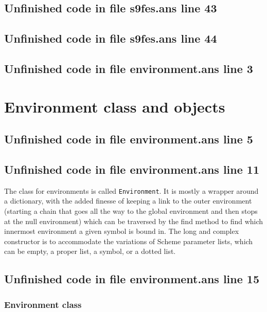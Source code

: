 \documentclass[twoside,9pt]{report}
\begin{document}
\section{Unfinished code in file s9fes.ans line 43}
\section{Unfinished code in file s9fes.ans line 44}
\section{Unfinished code in file environment.ans line 3}
\chapter{Environment class and objects}
\label{environment-class-and-objects}
\section{Unfinished code in file environment.ans line 5}

\section{Unfinished code in file environment.ans line 11}

The class for environments is called \texttt{Environment}. It is mostly a wrapper around a dictionary, with the added finesse of keeping a link to the outer environment (starting a chain that goes all the way to the global environment and then stops at the null environment) which can be traversed by the find method to find which innermost environment a given symbol is bound in. The long and complex constructor is to accommodate the variations of Scheme parameter lists, which can be empty, a proper list, a symbol, or a dotted list.

\section{Unfinished code in file environment.ans line 15}
\subsection{Environment class}
\label{environment-class}
\end{document}
